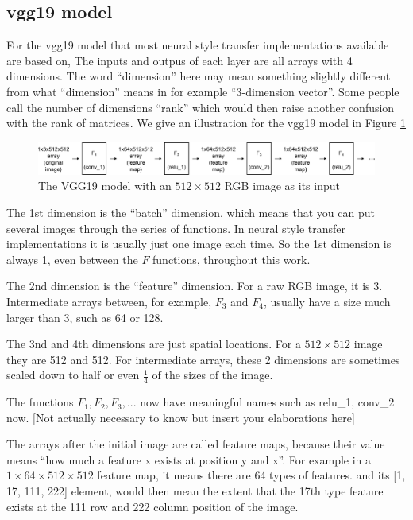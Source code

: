 \documentclass[runningheads]{llncs}
\begin{document}
\subsection{vgg19 model}
For the vgg19 model that most neural style transfer implementations available are based on,
The inputs and outpus of each layer are all arrays with 4 dimensions.
The word ``dimension'' here may mean something slightly different from what ``dimension'' means in
for example ``$3$-dimension vector''. 
Some people call the number of dimensions ``rank'' which would then raise another confusion with the rank of matrices.
We give an illustration for the vgg19 model in Figure \ref{vgg512}
\begin{figure}
\center
\includegraphics[width=\textwidth]{vgg512.pdf}
\caption{The VGG19 model with an $512\times512$ RGB image as its input \label{vgg512}}
\end{figure}

The 1st dimension is the ``batch'' dimension, which means that you can put several images through the
series of functions.
In neural style transfer implementations it is usually just one image each time.
So the 1st dimension is always 1, even between the $F$ functions, throughout this work.

The 2nd dimension is the ``feature'' dimension. For a raw RGB image, it is 3.
Intermediate arrays between, for example, $F_3$ and $F_4$, usually 
have a size much larger than 3, such as 64 or 128.

The 3nd and 4th dimensions are just spatial locations. 
For a $512\times512$ image they are 512 and 512. 
For intermediate arrays, these 2 dimensions are sometimes scaled down
to half or even $\frac{1}{4}$ of the sizes of the image.

The functions $F_1,F_2,F_3,...$ now have meaningful names such as relu\_1, conv\_2 now.
[Not actually necessary to know but insert your elaborations here]

The arrays after the initial image are called feature maps, because their value means
``how much a feature x exists at position y and x''.
For example in a $1\times64\times512\times512$ feature map, it means there are 64 types of features.
and its [1, 17, 111, 222] element, would then mean the extent that the 17th type feature exists
at the 111 row and 222 column position of the image.
\end{document}
